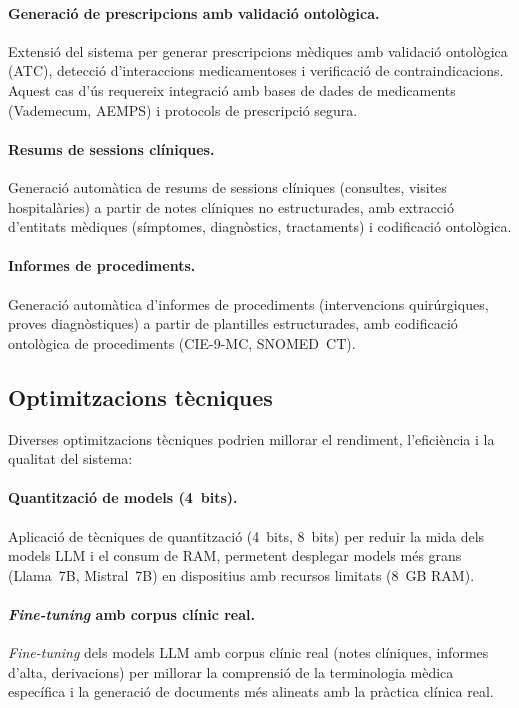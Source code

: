 \documentclass[CAT]{TFUOC}%
\begin{document}
\paragraph{Generació de prescripcions amb validació ontològica.}
Extensió del sistema per generar prescripcions mèdiques amb validació ontològica (ATC), detecció d'interaccions medicamentoses i verificació de contraindicacions. Aquest cas d'ús requereix integració amb bases de dades de medicaments (Vademecum, AEMPS) i protocols de prescripció segura.

\paragraph{Resums de sessions clíniques.}
Generació automàtica de resums de sessions clíniques (consultes, visites hospitalàries) a partir de notes clíniques no estructurades, amb extracció d'entitats mèdiques (símptomes, diagnòstics, tractaments) i codificació ontològica.

\paragraph{Informes de procediments.}
Generació automàtica d'informes de procediments (intervencions quirúrgiques, proves diagnòstiques) a partir de plantilles estructurades, amb codificació ontològica de procediments (CIE-9-MC, SNOMED~CT).

\subsection{Optimitzacions tècniques}

Diverses optimitzacions tècniques podrien millorar el rendiment, l'eficiència i la qualitat del sistema:

\paragraph{Quantització de models (4~bits).}
Aplicació de tècniques de quantització (4~bits, 8~bits) per reduir la mida dels models LLM i el consum de RAM, permetent desplegar models més grans (Llama~7B, Mistral~7B) en dispositius amb recursos limitats (8~GB RAM).

\paragraph{\textit{Fine-tuning} amb corpus clínic real.}
\textit{Fine-tuning} dels models LLM amb corpus clínic real (notes clíniques, informes d'alta, derivacions) per millorar la comprensió de la terminologia mèdica específica i la generació de documents més alineats amb la pràctica clínica real.
\end{document}

